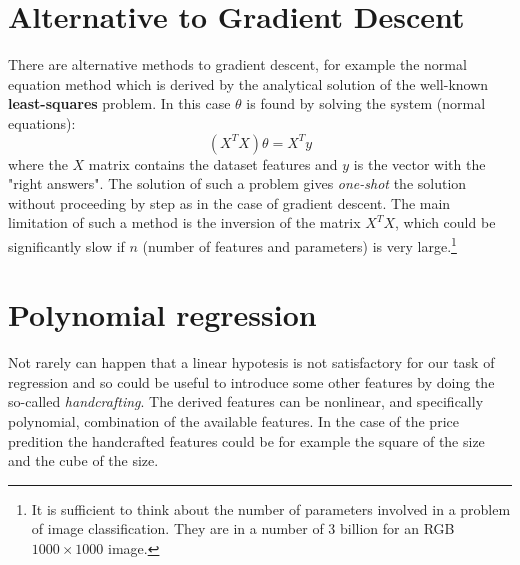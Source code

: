 \section{Alternative to Gradient Descent}
There are alternative methods to gradient descent, for example the normal equation method which is derived by the analytical solution of the well-known \textbf{least-squares} problem. In this case $\theta$ is found by solving the system (normal equations):
\begin{equation}
    (X^T X)\theta = X^T{y}
\end{equation}
where the $X$ matrix contains the dataset features and $y$ is the vector with the "right answers". The solution of such a problem gives \textit{one-shot} the solution without proceeding by step as in the case  of gradient descent. The main limitation of such a method is the inversion of the matrix $X^T X$, which could be significantly slow if $n$ (number of features and parameters) is very large.\footnote{
    It is sufficient to think about the number of parameters involved in a problem of image classification. They are in a number of 3 billion for an RGB $1000\times1000$ image. 
}

\section{Polynomial regression}
Not rarely can happen that a linear hypotesis is not satisfactory for our task of regression and so could be useful to introduce some other features by doing the so-called \textit{handcrafting}. The derived features can be nonlinear, and specifically polynomial, combination of the available features. In the case of the price predition the handcrafted features could be for example the square of the size and the cube of the size. 


